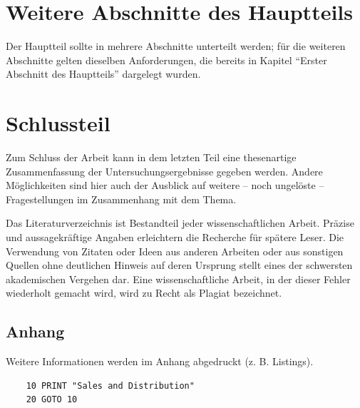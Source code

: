 \documentclass[11pt]{scrartcl}
\begin{document}
\section{Weitere Abschnitte des Hauptteils}
Der Hauptteil sollte in mehrere Abschnitte unterteilt werden; für die weiteren Abschnitte gelten dieselben Anforderungen, die bereits in Kapitel "`Erster Abschnitt des Hauptteils"' dargelegt wurden.

\section{Schlussteil}
Zum Schluss der Arbeit kann in dem letzten Teil eine thesenartige Zusammenfassung der Untersuchungsergebnisse gegeben werden. Andere Möglichkeiten sind hier auch der Ausblick auf weitere – noch ungelöste – Fragestellungen im Zusammenhang mit dem Thema.

\newpage


Das Literaturverzeichnis ist Bestandteil jeder wissenschaftlichen Arbeit. Präzise und aussagekräftige Angaben erleichtern die Recherche für spätere Leser. Die Verwendung von Zitaten oder Ideen aus anderen Arbeiten oder aus sonstigen Quellen ohne deutlichen Hinweis auf deren Ursprung stellt eines der schwersten akademischen Vergehen dar. Eine wissenschaftliche Arbeit, in der dieser Fehler wiederholt gemacht wird, wird zu Recht als Plagiat bezeichnet.



\newpage

\begin{appendix}

\section{Anhang}
Weitere Informationen werden im Anhang abgedruckt (z. B. Listings).

	\begin{verbatim}
	10 PRINT "Sales and Distribution"
	20 GOTO 10
	\end{verbatim}
	
\end{appendix}
\end{document}
